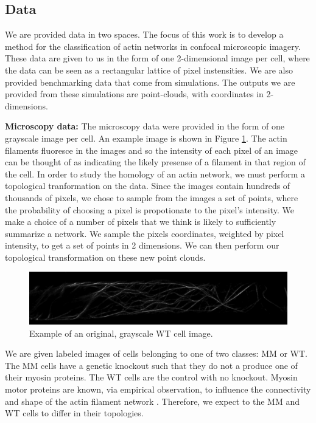 \documentclass[10pt]{article}
\begin{document}
\subsection{Data}
We are provided data in two spaces. The focus of this work is to develop a method for the classification of actin networks in confocal microscopic imagery. These data are given to us in the form of one 2-dimensional image per cell, where the data can be seen as a rectangular lattice of pixel instensities. We are also provided benchmarking data that come from simulations. The outputs we are provided from these simulations are point-clouds, with coordinates in 2-dimensions.

\textbf{Microscopy data:}
The microscopy data were provided in the form of one grayscale image per cell. An example image is shown in Figure \ref{fig:wtCell}. The actin filaments fluoresce in the images and so the intensity of each pixel of an image can be thought of as indicating the likely presense of a filament in that region of the cell. In order to study the homology of an actin network, we must perform a topological tranformation on the data. Since the images contain hundreds of thousands of pixels, we chose to sample from the images a set of points, where the probability of choosing a pixel is propotionate to the pixel's intensity. We make a choice of a number of pixels that we think is likely to sufficiently summarize a network. We sample the pixels coordinates, weighted by pixel intensity, to get a set of points in 2 dimensions. We can then perform our topological transformation on these new point clouds.

\begin{figure}[H]
	\begin{center}
		\includegraphics[width=1\textwidth]{figures/wtCell.png}
	\end{center}
	\caption{Example of an original, grayscale WT cell image.}
	\label{fig:wtCell}
\end{figure}

We are given labeled images of cells belonging to one of two classes: MM or WT. The MM cells have a genetic knockout such that they do not a produce one of their myosin proteins. The WT cells are the control with no knockout. Myosin motor proteins are known, via empirical observation, to influence the connectivity and shape of the actin filament network \cite{ueda2010myosin,madison2015class,peremyslov2010class,park2013myosin}. Therefore, we expect to the MM and WT cells to differ in their topologies.
\end{document}
